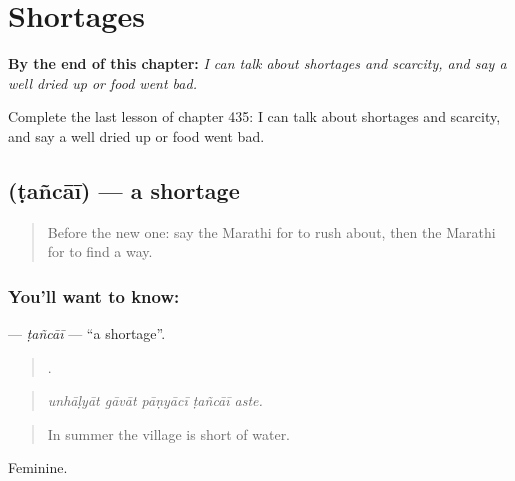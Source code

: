 
\chapter{Shortages}
\label{ch:mr-shortages}

\begin{chapteropening}
\textbf{By the end of this chapter:} \emph{I can talk about shortages and scarcity, and say a well dried up or food went bad.}

Complete the last lesson of chapter 435: I can talk about shortages and scarcity, and say a well dried up or food went bad.
\end{chapteropening}

\section[\texorpdfstring{\mr{टंचाई} (ṭañcāī)}{टंचाई (ṭañcāī)}]{ (ṭañcāī) — a shortage}

\label{lesson:MR-C435-tancai}



\begin{quote}
Before the new one: say the Marathi for to rush about, then the Marathi for to find a way.
\end{quote}

\subsection*{You'll want to know: }
\textbf{} — \emph{ṭañcāī} — \textquotedblleft{}a shortage\textquotedblright{}.

\begin{quote}
    .
\end{quote}

\begin{quote}
\emph{unhāḷyāt gāvāt pāṇyācī ṭañcāī aste.}
\end{quote}

\begin{quote}
In summer the village is short of water.
\end{quote}

Feminine.


